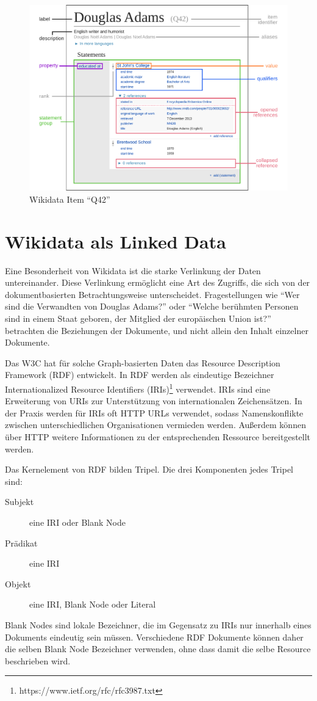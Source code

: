 \begin{figure}
  \includegraphics[width=\linewidth]{pics/Datamodel_in_Wikidata}
  \caption{Wikidata Item ``Q42''}
  \label{fig:wd-datamodel}
\end{figure}

\section{Wikidata als Linked Data}
Eine Besonderheit von Wikidata ist die starke Verlinkung der Daten untereinander.
Diese Verlinkung ermöglicht eine Art des Zugriffs, die sich von der dokumentbasierten Betrachtungsweise unterscheidet.
Fragestellungen wie ``Wer sind die Verwandten von Douglas Adams?'' oder ``Welche berühmten Personen sind in einem Staat geboren, der Mitglied der europäischen Union ist?'' betrachten die Beziehungen der Dokumente, und nicht allein den Inhalt einzelner Dokumente.

Das W3C hat für solche Graph-basierten Daten das Resource Description Framework (RDF) entwickelt.
In RDF werden als eindeutige Bezeichner Internationalized Resource Identifiers (IRIs)\footnote{https://www.ietf.org/rfc/rfc3987.txt} verwendet.
IRIs sind eine Erweiterung von URIs zur Unterstützung von internationalen Zeichensätzen.
In der Praxis werden für IRIs oft HTTP URLs verwendet, sodass Namenskonflikte zwischen unterschiedlichen Organisationen vermieden werden.
Außerdem können über HTTP weitere Informationen zu der entsprechenden Ressource bereitgestellt werden.

Das Kernelement von RDF bilden Tripel. Die drei Komponenten jedes Tripel sind:
\begin{description}
\item[Subjekt] eine IRI oder Blank Node
\item[Prädikat] eine IRI
\item[Objekt] eine IRI, Blank Node oder Literal
\end{description}
Blank Nodes sind lokale Bezeichner, die im Gegensatz zu IRIs nur innerhalb eines Dokuments eindeutig sein müssen.
Verschiedene RDF Dokumente können daher die selben Blank Node Bezeichner verwenden, ohne dass damit die selbe Resource beschrieben wird.

